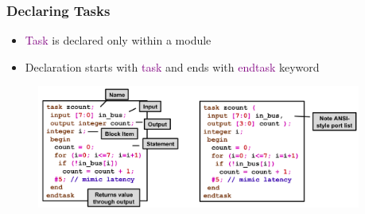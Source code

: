 \documentclass[t, notes, xcolor=table]{beamer}
\begin{document}
\begin{frame}
\frametitle{Declaring Tasks}
\begin{itemize}
\item \textcolor{purple}{Task} is declared only within a module
\item Declaration starts with \textcolor{purple}{task} and ends with \textcolor{purple}{endtask} keyword
\end{itemize}
\begin{figure}
    \includegraphics[width=0.95\textwidth]{img/10_task.png}
\end{figure}
\end{frame}
\end{document}
